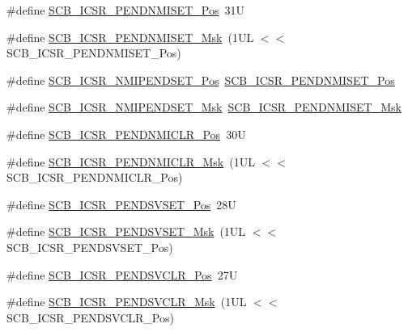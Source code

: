 \begin{DoxyCompactItemize}
\item 
\#define \mbox{\hyperlink{group___c_m_s_i_s___s_c_b_gac180386fac3a5701e6060084dacd003a}{S\+C\+B\+\_\+\+I\+C\+S\+R\+\_\+\+P\+E\+N\+D\+N\+M\+I\+S\+E\+T\+\_\+\+Pos}}~31U
\item 
\#define \mbox{\hyperlink{group___c_m_s_i_s___s_c_b_gadb4dbf66078026dedc24e8cb9a21b2b1}{S\+C\+B\+\_\+\+I\+C\+S\+R\+\_\+\+P\+E\+N\+D\+N\+M\+I\+S\+E\+T\+\_\+\+Msk}}~(1\+U\+L $<$$<$ S\+C\+B\+\_\+\+I\+C\+S\+R\+\_\+\+P\+E\+N\+D\+N\+M\+I\+S\+E\+T\+\_\+\+Pos)
\item 
\#define \mbox{\hyperlink{group___c_m_s_i_s___s_c_b_ga750d4b52624a46d71356db4ea769573b}{S\+C\+B\+\_\+\+I\+C\+S\+R\+\_\+\+N\+M\+I\+P\+E\+N\+D\+S\+E\+T\+\_\+\+Pos}}~\mbox{\hyperlink{group___c_m_s_i_s___s_c_b_gac180386fac3a5701e6060084dacd003a}{S\+C\+B\+\_\+\+I\+C\+S\+R\+\_\+\+P\+E\+N\+D\+N\+M\+I\+S\+E\+T\+\_\+\+Pos}}
\item 
\#define \mbox{\hyperlink{group___c_m_s_i_s___s_c_b_ga340e3f79e9c3607dee9f2c048b6b22e8}{S\+C\+B\+\_\+\+I\+C\+S\+R\+\_\+\+N\+M\+I\+P\+E\+N\+D\+S\+E\+T\+\_\+\+Msk}}~\mbox{\hyperlink{group___c_m_s_i_s___s_c_b_gadb4dbf66078026dedc24e8cb9a21b2b1}{S\+C\+B\+\_\+\+I\+C\+S\+R\+\_\+\+P\+E\+N\+D\+N\+M\+I\+S\+E\+T\+\_\+\+Msk}}
\item 
\#define \mbox{\hyperlink{group___c_m_s_i_s___s_c_b_gad4c1ddde49ff0d3ed1b843d14d38ebf1}{S\+C\+B\+\_\+\+I\+C\+S\+R\+\_\+\+P\+E\+N\+D\+N\+M\+I\+C\+L\+R\+\_\+\+Pos}}~30U
\item 
\#define \mbox{\hyperlink{group___c_m_s_i_s___s_c_b_gace870429ae27601613da7c6f6e53a18f}{S\+C\+B\+\_\+\+I\+C\+S\+R\+\_\+\+P\+E\+N\+D\+N\+M\+I\+C\+L\+R\+\_\+\+Msk}}~(1\+U\+L $<$$<$ S\+C\+B\+\_\+\+I\+C\+S\+R\+\_\+\+P\+E\+N\+D\+N\+M\+I\+C\+L\+R\+\_\+\+Pos)
\item 
\#define \mbox{\hyperlink{group___c_m_s_i_s___s_c_b_gab5ded23d2ab1d5ff7cc7ce746205e9fe}{S\+C\+B\+\_\+\+I\+C\+S\+R\+\_\+\+P\+E\+N\+D\+S\+V\+S\+E\+T\+\_\+\+Pos}}~28U
\item 
\#define \mbox{\hyperlink{group___c_m_s_i_s___s_c_b_ga1e40d93efb402763c8c00ddcc56724ff}{S\+C\+B\+\_\+\+I\+C\+S\+R\+\_\+\+P\+E\+N\+D\+S\+V\+S\+E\+T\+\_\+\+Msk}}~(1\+U\+L $<$$<$ S\+C\+B\+\_\+\+I\+C\+S\+R\+\_\+\+P\+E\+N\+D\+S\+V\+S\+E\+T\+\_\+\+Pos)
\item 
\#define \mbox{\hyperlink{group___c_m_s_i_s___s_c_b_gae218d9022288f89faf57187c4d542ecd}{S\+C\+B\+\_\+\+I\+C\+S\+R\+\_\+\+P\+E\+N\+D\+S\+V\+C\+L\+R\+\_\+\+Pos}}~27U
\item 
\#define \mbox{\hyperlink{group___c_m_s_i_s___s_c_b_ga4a901ace381d3c1c74ac82b22fae2e1e}{S\+C\+B\+\_\+\+I\+C\+S\+R\+\_\+\+P\+E\+N\+D\+S\+V\+C\+L\+R\+\_\+\+Msk}}~(1\+U\+L $<$$<$ S\+C\+B\+\_\+\+I\+C\+S\+R\+\_\+\+P\+E\+N\+D\+S\+V\+C\+L\+R\+\_\+\+Pos)

\end{DoxyCompactItemize}

